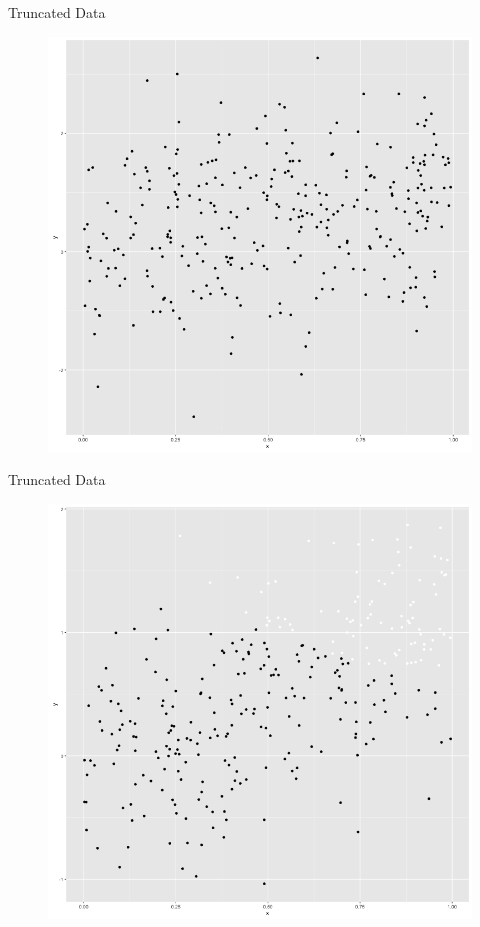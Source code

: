 \documentclass{beamer}
\begin{document}
\begin{frame}{Truncated Data}
\begin{figure}
\centering
\includegraphics[width=.7\textwidth]{plot_zoom_png-2.png}
\end{figure}



\end{frame}

\begin{frame}{Truncated Data}
\begin{figure}
\centering
\includegraphics[width=.7\textwidth]{plot_zoom_png-3.png}

\end{figure}

\end{frame}
\end{document}
